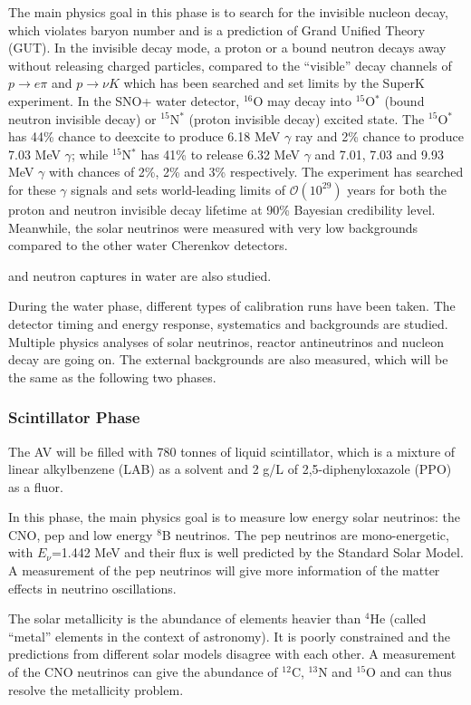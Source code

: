 The main physics goal in this phase is to search for the invisible nucleon decay, which violates baryon number and is a prediction of Grand Unified Theory (GUT). In the invisible decay mode, a proton or a bound neutron decays away without releasing charged particles, compared to the ``visible'' decay channels of $p\to e\pi$ and $p\to\nu K$ which has been searched and set limits by the SuperK experiment. In the SNO+ water detector, $^{16}$O may decay into $^{15}$O$^*$ (bound neutron invisible decay) or $ ^{15}$N$^*$ (proton invisible decay) excited state. The $^{15}$O$^*$ has 44\% chance to deexcite to produce 6.18 MeV $\gamma$ ray and 2\% chance to produce 7.03 MeV $\gamma$; while $^{15}$N$^*$ has 41\% to release 6.32 MeV $\gamma$ and 7.01, 7.03 and 9.93 MeV $\gamma$ with chances of 2\%, 2\% and 3\% respectively. The experiment has searched for these $\gamma$ signals and sets world-leading limits of $\mathcal{O}(10^{29})$ years for both the proton and neutron invisible decay lifetime at 90\% Bayesian credibility level\cite{anderson2019search}. Meanwhile, the solar neutrinos were measured with very low backgrounds compared to the other water Cherenkov detectors.

 and neutron captures in water are also studied.

During the water phase, different types of calibration runs have been taken. The detector timing and energy response, systematics and backgrounds are studied. Multiple physics analyses of solar neutrinos, reactor antineutrinos and nucleon decay are going on. The external backgrounds are also measured, which will be the same as the following two phases. 

\subsubsection{Scintillator Phase}

The AV will be filled with 780 tonnes of liquid scintillator, which is a mixture of linear alkylbenzene (LAB) as a solvent and 2 g/L of 2,5-diphenyloxazole (PPO) as a fluor.

In this phase, the main physics goal is to measure low energy solar neutrinos: the CNO, pep and low energy $^8$B neutrinos. The pep neutrinos are mono-energetic, with $E_\nu$=1.442 MeV and their flux is well predicted by the Standard Solar Model\cite{davini2016cno}. A measurement of the pep neutrinos will give more information of the matter effects in neutrino oscillations. 

The solar metallicity is the abundance of elements heavier than $^4$He (called ``metal'' elements in the context of astronomy). It is poorly constrained and the predictions from different solar models disagree with each other. A measurement of the CNO neutrinos can give the abundance of $^{12}$C, $^{13}$N and $^{15}$O and can thus resolve the metallicity problem\cite{cerdeno2018cno}.

